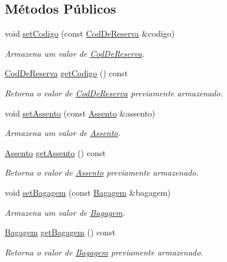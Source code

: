 \subsection*{Métodos Públicos}
\begin{DoxyCompactItemize}
\item 
void \hyperlink{classshibarides_1_1Reserva_a8f2e70e8f8e6a0b739731c3ddaca1e2f}{set\+Codigo} (const \hyperlink{classshibarides_1_1CodDeReserva}{Cod\+De\+Reserva} \&codigo)
\begin{DoxyCompactList}\small\item\em Armazena um valor de \hyperlink{classshibarides_1_1CodDeReserva}{Cod\+De\+Reserva}. \end{DoxyCompactList}\item 
\hyperlink{classshibarides_1_1CodDeReserva}{Cod\+De\+Reserva} \hyperlink{classshibarides_1_1Reserva_a707e6f4248e3ee1ed8f0c1e3893c834d}{get\+Codigo} () const 
\begin{DoxyCompactList}\small\item\em Retorna o valor de \hyperlink{classshibarides_1_1CodDeReserva}{Cod\+De\+Reserva} previamente armazenado. \end{DoxyCompactList}\item 
void \hyperlink{classshibarides_1_1Reserva_a9013c5f1d6638ccc77e4a37071409d9b}{set\+Assento} (const \hyperlink{classshibarides_1_1Assento}{Assento} \&assento)
\begin{DoxyCompactList}\small\item\em Armazena um valor de \hyperlink{classshibarides_1_1Assento}{Assento}. \end{DoxyCompactList}\item 
\hyperlink{classshibarides_1_1Assento}{Assento} \hyperlink{classshibarides_1_1Reserva_a9a2c89b1c70b8ad4dc8124a229c5c8ca}{get\+Assento} () const 
\begin{DoxyCompactList}\small\item\em Retorna o valor de \hyperlink{classshibarides_1_1Assento}{Assento} previamente armazenado. \end{DoxyCompactList}\item 
void \hyperlink{classshibarides_1_1Reserva_aaef804b78d7ae0979d38625f29ee7a09}{set\+Bagagem} (const \hyperlink{classshibarides_1_1Bagagem}{Bagagem} \&bagagem)
\begin{DoxyCompactList}\small\item\em Armazena um valor de \hyperlink{classshibarides_1_1Bagagem}{Bagagem}. \end{DoxyCompactList}\item 
\hyperlink{classshibarides_1_1Bagagem}{Bagagem} \hyperlink{classshibarides_1_1Reserva_a427286c7b59a6cf0ea17bd9cb8165139}{get\+Bagagem} () const 
\begin{DoxyCompactList}\small\item\em Retorna o valor de \hyperlink{classshibarides_1_1Bagagem}{Bagagem} previamente armazenado. \end{DoxyCompactList}\end{DoxyCompactItemize}
